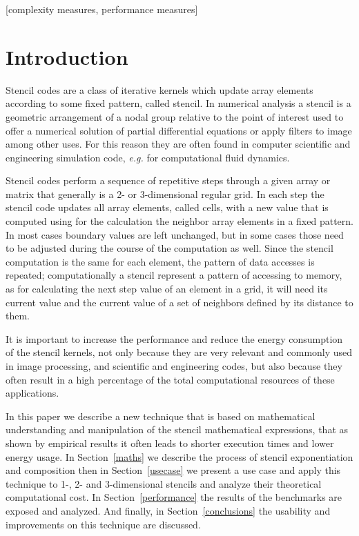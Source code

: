 \documentclass{acm_proc_article-sp}
\newcommand{\note}[1]{\todo[inline,color=yellow,bordercolor=orange,linecolor=orange]{#1}}
\begin{document}
\note{TODO: check for the right categories}
[complexity measures, performance measures]



\section{Introduction}
Stencil codes are a class of iterative kernels which update array elements according to some fixed pattern, called stencil\cite{roth:hpf}. In numerical analysis a stencil is a geometric arrangement of a nodal group relative to the point of interest used to offer a numerical solution of partial differential equations or apply filters to image among other uses. For this reason they are often found in computer scientific and engineering simulation code, \textit{e.g.} for computational fluid dynamics.

Stencil codes perform a sequence of repetitive steps through a given array or matrix that generally is a 2- or 3-dimensional regular grid\cite{dietmar:cs}. In each step the stencil code updates all array elements, called cells, with a new value that is computed using for the calculation the neighbor array elements in a fixed pattern\cite{leopold:tbcm}. In most cases boundary values are left unchanged, but in some cases those need to be adjusted during the course of the computation as well. Since the stencil computation is the same for each element, the pattern of data accesses is repeated\cite{chancaoguo:hpcpi}; computationally a stencil represent a pattern of accessing to memory, as for calculating the next step value of an element in a grid, it will need its current value and the current value of a set of neighbors defined by its distance to them.

It is important to increase the performance and reduce the energy consumption of the stencil kernels, not only because they are very relevant and commonly used in image processing, and scientific and engineering codes, but also because they often result in a high percentage of the total computational resources of these applications.

In this paper we describe a new technique that is based on mathematical understanding and manipulation of the stencil mathematical expressions, that as shown by empirical results it often leads to shorter execution times and lower energy usage. In Section~\ref{maths} we describe the process of stencil exponentiation and composition then in Section~\ref{usecase} we present a use case and apply this technique to 1-, 2- and 3-dimensional stencils and analyze their theoretical computational cost. In Section~\ref{performance} the results of the benchmarks are exposed and analyzed. And finally, in Section~\ref{conclusions} the usability and improvements on this technique are discussed.
\end{document}
